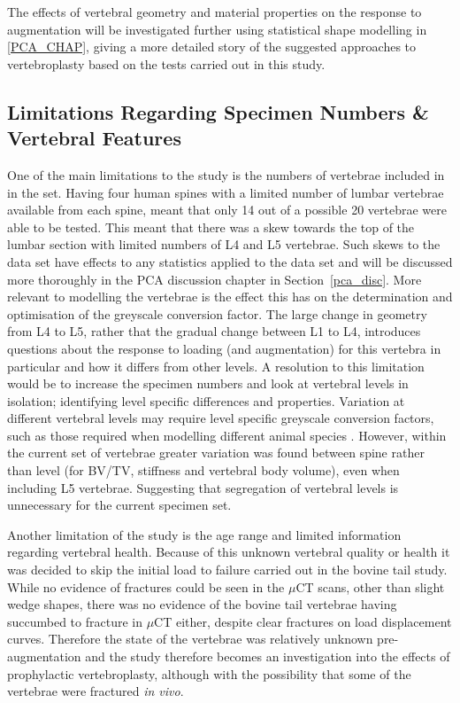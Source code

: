 The effects of vertebral geometry and material properties on the response to augmentation will be investigated further using statistical shape modelling in \cref{PCA_CHAP}, giving a more detailed story of the suggested approaches to vertebroplasty based on the tests carried out in this study.

\subsection{Limitations Regarding Specimen Numbers \& Vertebral Features}

One of the main limitations to the study is the numbers of vertebrae included in in the set.
Having four human spines with a limited number of lumbar vertebrae available from each spine, meant that only 14 out of a possible 20 vertebrae were able to be tested.
This meant that there was a skew towards the top of the lumbar section with limited numbers of L4 and L5 vertebrae.
Such skews to the data set have effects to any statistics applied to the data set and will be discussed more thoroughly in the PCA discussion chapter in Section~\ref{pca_disc}.
More relevant to modelling the vertebrae is the effect this has on the determination and optimisation of the greyscale conversion factor.
The large change in geometry from L4 to L5, rather that the gradual change between L1 to L4, introduces questions about the response to loading (and augmentation) for this vertebra in particular and how it differs from other levels.
A resolution to this limitation would be to increase the specimen numbers and look at vertebral levels in isolation; identifying level specific differences and properties.
Variation at different vertebral levels may require level specific greyscale conversion factors, such as those required when modelling different animal species \cite{zapata2017methodology}.
However, within the current set of vertebrae greater variation was found between spine rather than level (for BV/TV, stiffness and vertebral body volume), even when including L5 vertebrae.
Suggesting that segregation of vertebral levels is unnecessary for the current specimen set. 

Another limitation of the study is the age range and limited information regarding vertebral health.
Because of this unknown vertebral quality or health it was decided to skip the initial load to failure carried out in the bovine tail study.
While no evidence of fractures could be seen in the $\mu$CT scans, other than slight wedge shapes, there was no evidence of the bovine tail vertebrae having succumbed to fracture in $\mu$CT either, despite clear fractures on load displacement curves.
Therefore the state of the vertebrae was relatively unknown pre-augmentation and the study therefore becomes an investigation into the effects of prophylactic vertebroplasty, although with the possibility that some of the vertebrae were fractured \textit{in vivo}.




